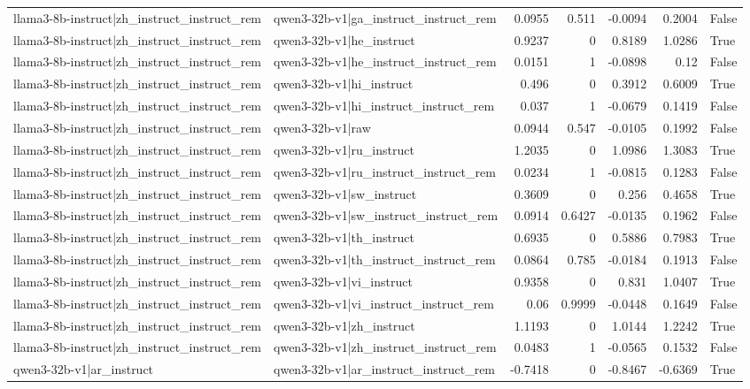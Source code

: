 \begin{table}
\begin{tabular}{l l r r r r l}
llama3-8b-instruct|zh_instruct_instruct_rem & qwen3-32b-v1|ga_instruct_instruct_rem & 0.0955 & 0.511 & -0.0094 & 0.2004 & False \\
llama3-8b-instruct|zh_instruct_instruct_rem & qwen3-32b-v1|he_instruct & 0.9237 & 0 & 0.8189 & 1.0286 & True \\
llama3-8b-instruct|zh_instruct_instruct_rem & qwen3-32b-v1|he_instruct_instruct_rem & 0.0151 & 1 & -0.0898 & 0.12 & False \\
llama3-8b-instruct|zh_instruct_instruct_rem & qwen3-32b-v1|hi_instruct & 0.496 & 0 & 0.3912 & 0.6009 & True \\
llama3-8b-instruct|zh_instruct_instruct_rem & qwen3-32b-v1|hi_instruct_instruct_rem & 0.037 & 1 & -0.0679 & 0.1419 & False \\
llama3-8b-instruct|zh_instruct_instruct_rem & qwen3-32b-v1|raw & 0.0944 & 0.547 & -0.0105 & 0.1992 & False \\
llama3-8b-instruct|zh_instruct_instruct_rem & qwen3-32b-v1|ru_instruct & 1.2035 & 0 & 1.0986 & 1.3083 & True \\
llama3-8b-instruct|zh_instruct_instruct_rem & qwen3-32b-v1|ru_instruct_instruct_rem & 0.0234 & 1 & -0.0815 & 0.1283 & False \\
llama3-8b-instruct|zh_instruct_instruct_rem & qwen3-32b-v1|sw_instruct & 0.3609 & 0 & 0.256 & 0.4658 & True \\
llama3-8b-instruct|zh_instruct_instruct_rem & qwen3-32b-v1|sw_instruct_instruct_rem & 0.0914 & 0.6427 & -0.0135 & 0.1962 & False \\
llama3-8b-instruct|zh_instruct_instruct_rem & qwen3-32b-v1|th_instruct & 0.6935 & 0 & 0.5886 & 0.7983 & True \\
llama3-8b-instruct|zh_instruct_instruct_rem & qwen3-32b-v1|th_instruct_instruct_rem & 0.0864 & 0.785 & -0.0184 & 0.1913 & False \\
llama3-8b-instruct|zh_instruct_instruct_rem & qwen3-32b-v1|vi_instruct & 0.9358 & 0 & 0.831 & 1.0407 & True \\
llama3-8b-instruct|zh_instruct_instruct_rem & qwen3-32b-v1|vi_instruct_instruct_rem & 0.06 & 0.9999 & -0.0448 & 0.1649 & False \\
llama3-8b-instruct|zh_instruct_instruct_rem & qwen3-32b-v1|zh_instruct & 1.1193 & 0 & 1.0144 & 1.2242 & True \\
llama3-8b-instruct|zh_instruct_instruct_rem & qwen3-32b-v1|zh_instruct_instruct_rem & 0.0483 & 1 & -0.0565 & 0.1532 & False \\
qwen3-32b-v1|ar_instruct & qwen3-32b-v1|ar_instruct_instruct_rem & -0.7418 & 0 & -0.8467 & -0.6369 & True \\

\end{tabular}
\end{table}
